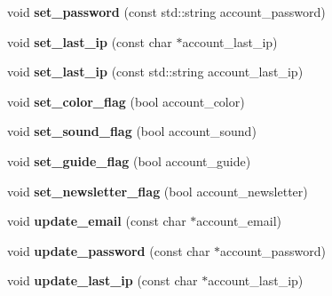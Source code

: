 \begin{DoxyCompactItemize}
\item 
\hypertarget{classaccount_a50bc1922ef23018fc1e09ae4844c906a}{void {\bfseries set\-\_\-password} (const std\-::string account\-\_\-password)}\label{classaccount_a50bc1922ef23018fc1e09ae4844c906a}

\item 
\hypertarget{classaccount_a2e5fab61ce141ebb4ad25e27ccacbcf1}{void {\bfseries set\-\_\-last\-\_\-ip} (const char $\ast$account\-\_\-last\-\_\-ip)}\label{classaccount_a2e5fab61ce141ebb4ad25e27ccacbcf1}

\item 
\hypertarget{classaccount_a5de1f206c48cd36e5442c6ac70846bc4}{void {\bfseries set\-\_\-last\-\_\-ip} (const std\-::string account\-\_\-last\-\_\-ip)}\label{classaccount_a5de1f206c48cd36e5442c6ac70846bc4}

\item 
\hypertarget{classaccount_a841ded037dd27811984898165f085281}{void {\bfseries set\-\_\-color\-\_\-flag} (bool account\-\_\-color)}\label{classaccount_a841ded037dd27811984898165f085281}

\item 
\hypertarget{classaccount_ac02f709994fdedeb88d038f9303b51ec}{void {\bfseries set\-\_\-sound\-\_\-flag} (bool account\-\_\-sound)}\label{classaccount_ac02f709994fdedeb88d038f9303b51ec}

\item 
\hypertarget{classaccount_acf2fe805f4d715a3a94911d4125b30d5}{void {\bfseries set\-\_\-guide\-\_\-flag} (bool account\-\_\-guide)}\label{classaccount_acf2fe805f4d715a3a94911d4125b30d5}

\item 
\hypertarget{classaccount_aeb0f7811000fa54ef1bcf2ba8a271921}{void {\bfseries set\-\_\-newsletter\-\_\-flag} (bool account\-\_\-newsletter)}\label{classaccount_aeb0f7811000fa54ef1bcf2ba8a271921}

\item 
\hypertarget{classaccount_a42fc12e16ea1ef1faff7b926a676cdf1}{void {\bfseries update\-\_\-email} (const char $\ast$account\-\_\-email)}\label{classaccount_a42fc12e16ea1ef1faff7b926a676cdf1}

\item 
\hypertarget{classaccount_a9e01213fc90e19ada49964f7876ea880}{void {\bfseries update\-\_\-password} (const char $\ast$account\-\_\-password)}\label{classaccount_a9e01213fc90e19ada49964f7876ea880}

\item 
\hypertarget{classaccount_a599986e5db6cebafb398690c7d4a98e6}{void {\bfseries update\-\_\-last\-\_\-ip} (const char $\ast$account\-\_\-last\-\_\-ip)}\label{classaccount_a599986e5db6cebafb398690c7d4a98e6}


\end{DoxyCompactItemize}

